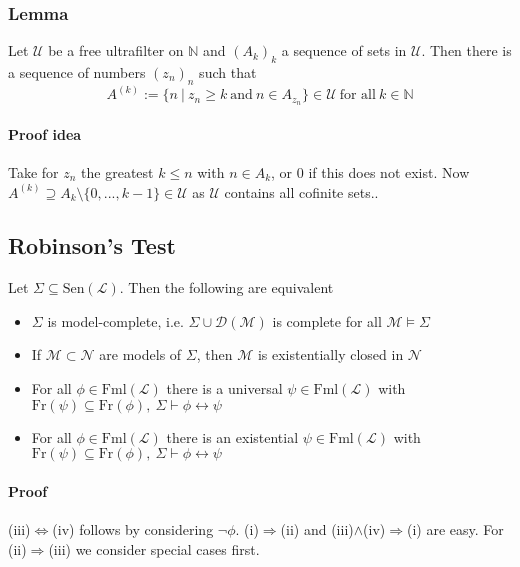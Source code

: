 \documentclass{scrartcl}
\newcommand{\N}{\mathbb{N}}
\begin{document}
\subsubsection{Lemma}
Let $\mathcal{U}$ be a free ultrafilter on $\N$ and $(A_k)_k$ a sequence of sets in $\mathcal{U}$. Then there is a sequence of numbers $(z_n)_n$ such that
\begin{equation*}
    A^{(k)} := \{ n \ | \ z_n \geq k \ \text{and} \ n \in A_{z_n} \} \in \mathcal{U} \ \text{for all} \ k \in \N
\end{equation*}
\paragraph{Proof idea} Take for $z_n$ the greatest $k \leq n$ with $n \in A_k$, or $0$ if this does not exist. Now $A^{(k)} \supseteq A_k \setminus \{ 0, ..., k - 1 \} \in \mathcal{U}$ as $\mathcal{U}$ contains all cofinite sets..

\subsection{Robinson's Test}
Let $\Sigma \subseteq \mathrm{Sen}(\mathcal{L})$. Then the following are equivalent
\begin{itemize}
    \item $\Sigma$ is model-complete, i.e. $\Sigma \cup \mathcal{D}(\mathcal{M})$ is complete for all $\mathcal{M} \models \Sigma$
    \item If $\mathcal{M} \subset \mathcal{N}$ are models of $\Sigma$, then $\mathcal{M}$ is existentially closed in $\mathcal{N}$
    \item For all $\phi \in \mathrm{Fml}(\mathcal{L})$ there is a universal $\psi \in \mathrm{Fml}(\mathcal{L})$ with $\mathrm{Fr}(\psi) \subseteq \mathrm{Fr}(\phi), \ \Sigma \vdash \phi \leftrightarrow \psi$
    \item For all $\phi \in \mathrm{Fml}(\mathcal{L})$ there is an existential $\psi \in \mathrm{Fml}(\mathcal{L})$ with $\mathrm{Fr}(\psi) \subseteq \mathrm{Fr}(\phi), \ \Sigma \vdash \phi \leftrightarrow \psi$
\end{itemize}
\paragraph{Proof} (iii)$\Leftrightarrow$(iv) follows by considering $\neg\phi$. (i)$\Rightarrow$(ii) and (iii)$\wedge$(iv)$\Rightarrow$(i) are easy. For (ii)$\Rightarrow$(iii) we consider special cases first.
\end{document}
